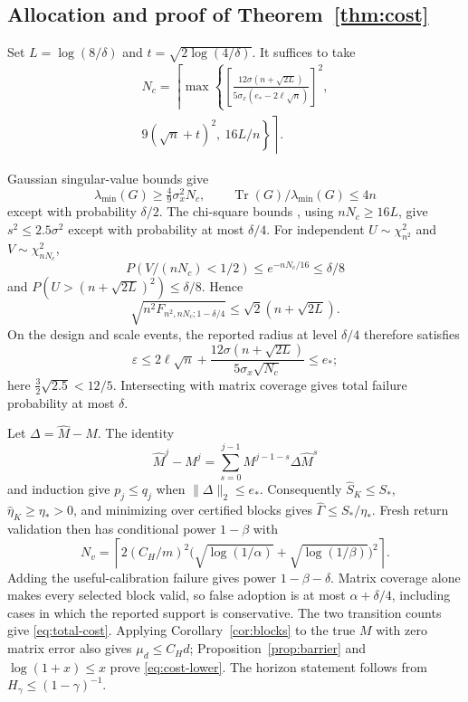 \documentclass[twocolumn,nameyear]{autart}
\begin{document}
\subsection{Allocation and proof of Theorem~\ref{thm:cost}}\label{app:cost}
Set $L=\log(8/\delta)$ and $t=\sqrt{2\log(4/\delta)}$. It suffices to take
\begin{align}\label{eq:ncal}
 N_c=\left\lceil\max\left\{
 \left[\frac{12\sigma(n+\sqrt{2L})}
 {5\sigma_x(e_*-2\ell\sqrt n)}\right]^2,\right.\right.\nonumber\\
 \left.\left.9(\sqrt n+t)^2,\ 16L/n\right\}\right\rceil.
\end{align}
\begin{pf}
Gaussian singular-value bounds
\citep[Corollary 5.35]{vershynin2012introduction} give
\[
 \lambda_{\min}(G)\ge\tfrac49\sigma_x^2N_c,
 \qquad \operatorname{Tr}(G)/\lambda_{\min}(G)\le4n
\]
except with probability $\delta/2$. The chi-square bounds
\citep[Lemma 1]{laurent2000adaptive}, using $nN_c\ge16L$, give
$s^2\le2.5\sigma^2$ except with probability at most $\delta/4$.
For independent $U\sim\chi^2_{n^2}$ and $V\sim\chi^2_{nN_c}$,
\[
 P(V/(nN_c)<1/2)\le e^{-nN_c/16}\le\delta/8
\]
and $P(U>(n+\sqrt{2L})^2)\le\delta/8$. Hence
\[
 \sqrt{n^2F_{n^2,nN_c;1-\delta/4}}
 \le\sqrt2(n+\sqrt{2L}).
\]
On the design and scale events, the reported radius at level $\delta/4$
therefore satisfies
\[
 \widehat\varepsilon\le2\ell\sqrt n+
 \frac{12\sigma(n+\sqrt{2L})}{5\sigma_x\sqrt{N_c}}\le e_*;
\]
here $\tfrac32\sqrt{2.5}<12/5$. Intersecting with matrix coverage
gives total failure probability at most $\delta$.

Let $\Delta=\widehat M-M$. The identity
\[
 \widehat M^j-M^j=
 \sum_{s=0}^{j-1}M^{j-1-s}\Delta\widehat M^s
\]
and induction give $p_j\le q_j$ when $\|\Delta\|_2\le e_*$.
Consequently $\widehat S_K\le S_*$,
$\widehat\eta_K\ge\eta_*>0$, and minimizing over certified blocks
gives $\widehat\Gamma\le S_*/\eta_*$.
Fresh return validation then has conditional power $1-\beta$ with
\begin{equation}\label{eq:nval}
 N_v=\left\lceil2(C_H/m)^2
 \bigl(\sqrt{\log(1/\alpha)}+\sqrt{\log(1/\beta)}\bigr)^2\right\rceil.
\end{equation}
Adding the useful-calibration failure gives power $1-\beta-\delta$.
Matrix coverage alone makes every selected block valid, so false
adoption is at most $\alpha+\delta/4$, including cases in which the
reported support is conservative. The two transition counts give
\eqref{eq:total-cost}. Applying Corollary~\ref{cor:blocks} to the true
$M$ with zero matrix error also gives $\mu_d\le C_Hd$;
Proposition~\ref{prop:barrier} and $\log(1+x)\le x$ prove
\eqref{eq:cost-lower}. The horizon statement follows from
$H_\gamma\le(1-\gamma)^{-1}$.
\end{pf}
\end{document}
